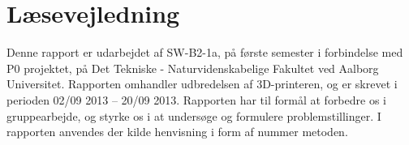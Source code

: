 \chapter{Læsevejledning} %
\label{cha:forord}
Denne rapport er udarbejdet af SW-B2-1a, på første semester i forbindelse med P0 projektet, på Det Tekniske - Naturvidenskabelige Fakultet ved Aalborg Universitet. Rapporten omhandler udbredelsen af 3D-printeren, og er skrevet i perioden 02/09 2013 – 20/09 2013.
Rapporten har til formål at forbedre os i gruppearbejde, og styrke os i at undersøge og formulere problemstillinger. 
I rapporten anvendes der kilde henvisning i form af nummer metoden.